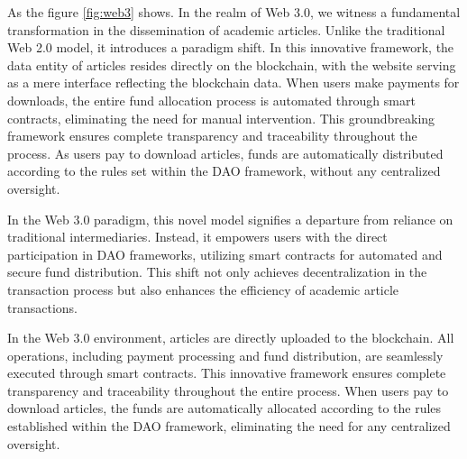 \documentclass[lettersize,journal]{IEEEtran}
\begin{document}
As the figure \ref{fig:web3} shows. In the realm of Web 3.0, we witness a fundamental transformation in the dissemination of academic articles. Unlike the traditional Web 2.0 model, it introduces a paradigm shift. In this innovative framework, the data entity of articles resides directly on the blockchain, with the website serving as a mere interface reflecting the blockchain data. When users make payments for downloads, the entire fund allocation process is automated through smart contracts, eliminating the need for manual intervention. This groundbreaking framework ensures complete transparency and traceability throughout the process. As users pay to download articles, funds are automatically distributed according to the rules set within the DAO framework, without any centralized oversight.

In the Web 3.0 paradigm, this novel model signifies a departure from reliance on traditional intermediaries. Instead, it empowers users with the direct participation in DAO frameworks, utilizing smart contracts for automated and secure fund distribution. This shift not only achieves decentralization in the transaction process but also enhances the efficiency of academic article transactions.

In the Web 3.0 environment, articles are directly uploaded to the blockchain. All operations, including payment processing and fund distribution, are seamlessly executed through smart contracts. This innovative framework ensures complete transparency and traceability throughout the entire process. When users pay to download articles, the funds are automatically allocated according to the rules established within the DAO framework, eliminating the need for any centralized oversight.
\end{document}
